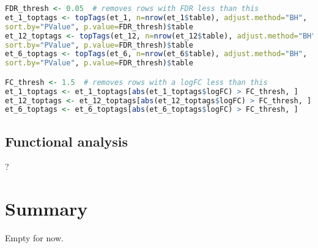 
\begin{lstlisting}[language=R, caption=Adjusting p-values and filtering data based on the logFC and FDR]
FDR_thresh <- 0.05  # removes rows with FDR less than this
et_1_toptags <- topTags(et_1, n=nrow(et_1$table), adjust.method="BH", 
sort.by="PValue", p.value=FDR_thresh)$table
et_12_toptags <- topTags(et_12, n=nrow(et_12$table), adjust.method="BH", 
sort.by="PValue", p.value=FDR_thresh)$table
et_6_toptags <- topTags(et_6, n=nrow(et_6$table), adjust.method="BH", 
sort.by="PValue", p.value=FDR_thresh)$table

FC_thresh <- 1.5  # removes rows with a logFC less than this
et_1_toptags <- et_1_toptags[abs(et_1_toptags$logFC) > FC_thresh, ]
et_12_toptags <- et_12_toptags[abs(et_12_toptags$logFC) > FC_thresh, ]
et_6_toptags <- et_6_toptags[abs(et_6_toptags$logFC) > FC_thresh, ]
\end{lstlisting}

\subsection{Functional analysis}
?





\section{Summary}
Empty for now.
